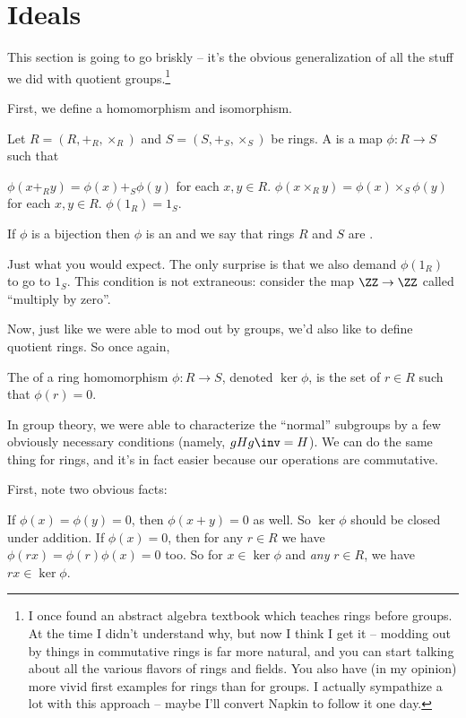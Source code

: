 \section{Ideals}
This section is going to go briskly --
it's the obvious generalization of all the stuff we did with quotient groups.\footnote{%
	I once found an abstract algebra textbook which teaches rings
	before groups.  At the time I didn't understand why,
	but now I think I get it -- modding out by things in
	commutative rings is far more natural, and you can start talking
	about all the various flavors of rings and fields.
	You also have (in my opinion) more vivid first examples
	for rings than for groups.
	I actually sympathize a lot with this approach -- maybe I'll convert
	Napkin to follow it one day.}

First, we define a homomorphism and isomorphism.

\begin{definition}
	Let $R = (R, +_R, \times_R)$ and $S = (S, +_S, \times_S)$ be rings.
	A  is a map $\phi : R \to S$
	such that 
	\begin{enumerate}[(i)]
		\ii $\phi(x +_R y) = \phi(x) +_S \phi(y)$ for each $x,y \in R$.
		\ii $\phi(x \times_R y) = \phi(x) \times_S \phi(y)$ for each $x,y \in R$.
		\ii $\phi(1_R) = 1_S$.
	\end{enumerate}
	If $\phi$ is a bijection then $\phi$ is an 
	and we say that rings $R$ and $S$ are .
\end{definition}
Just what you would expect.
The only surprise is that we also demand $\phi(1_R)$ to go to $1_S$.
This condition is not extraneous:
consider the map $\ZZ \to \ZZ$ called ``multiply by zero''.

Now, just like we were able to mod out by groups, we'd also like to define quotient rings.
So once again,
\begin{definition}
	The  of a ring homomorphism $\phi : R \to S$,
	denoted $\ker \phi$, is the set of $r \in R$ such that $\phi(r) = 0$.
\end{definition}

In group theory, we were able to characterize the ``normal'' subgroups by a few
obviously necessary conditions (namely, $gHg\inv = H$).
We can do the same thing for rings, and it's in fact easier because our operations are commutative.

First, note two obvious facts:
\begin{itemize}
	\ii If $\phi(x) = \phi(y) = 0$, then $\phi(x+y) = 0$ as well.
	So $\ker \phi$ should be closed under addition.
	\ii If $\phi(x) = 0$, then for any $r \in R$ we have
	$\phi(rx) = \phi(r)\phi(x) = 0$ too.
	So for $x \in \ker \phi$ and \emph{any} $r \in R$,
	we have $rx \in \ker\phi$.
\end{itemize}

